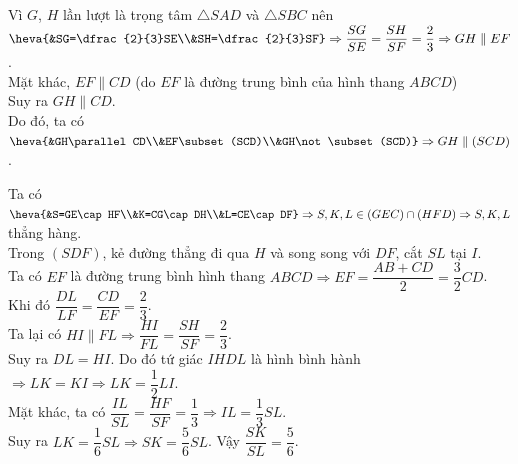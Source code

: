 \begin{bt}
{\begin{listEX}[1]
			\item Vì $G$, $H$ lần lượt là trọng tâm $\triangle SAD$ và $\triangle SBC$ nên $\heva{&SG=\dfrac{2}{3}SE\\&SH=\dfrac{2}{3}SF}\Rightarrow \dfrac{SG}{SE}=\dfrac{SH}{SF}=\dfrac{2}{3}\Rightarrow GH\parallel EF$.\\
			Mặt khác, $EF\parallel CD$ (do $EF$ là đường trung bình của hình thang $ABCD$)\\
			Suy ra $GH\parallel CD$.\\
			Do đó, ta có $\heva{&GH\parallel CD\\&EF\subset (SCD)\\&GH\not\subset (SCD)}\Rightarrow GH\parallel (SCD)$.
			\item Ta có $\heva{&S=GE\cap HF\\&K=CG\cap DH\\&L=CE\cap DF}\Rightarrow S,K,L \in (GEC)\cap(HFD)\Rightarrow S,K,L$ thẳng hàng.\\
			Trong $(SDF)$, kẻ đường thẳng đi qua $H$ và song song với $DF$, cắt $SL$ tại $I$.\\
			Ta có $EF$ là đường trung bình hình thang $ABCD\Rightarrow EF=\dfrac{AB+CD}{2}=\dfrac{3}{2}CD$.\\
			Khi đó $\dfrac{DL}{LF}=\dfrac{CD}{EF}=\dfrac{2}{3}$.\\
			Ta lại có $HI\parallel FL\Rightarrow \dfrac{HI}{FL}=\dfrac{SH}{SF}=\dfrac{2}{3}$.\\
			Suy ra $DL=HI$. Do đó tứ giác $IHDL$ là hình bình hành $\Rightarrow LK=KI\Rightarrow LK=\dfrac{1}{2}LI$.\\
			Mặt khác, ta có $\dfrac{IL}{SL}=\dfrac{HF}{SF}=\dfrac{1}{3}\Rightarrow IL=\dfrac{1}{3}SL$.\\
			Suy ra $LK=\dfrac{1}{6}SL\Rightarrow SK=\dfrac{5}{6}SL$. Vậy $\dfrac{SK}{SL}=\dfrac{5}{6}$.
		\end{listEX}	
	}
\end{bt}

